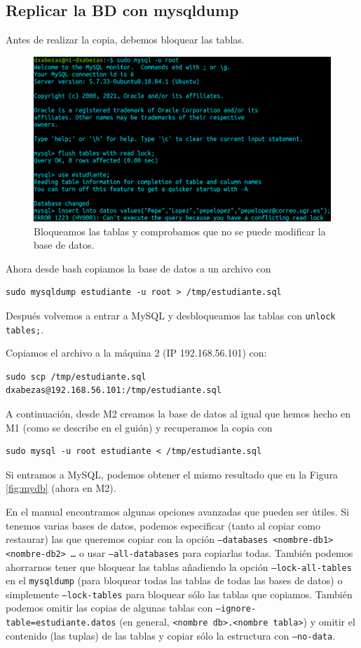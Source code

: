 \documentclass{article}
\begin{document}
\subsection{Replicar la BD con mysqldump}

Antes de realizar la copia, debemos bloquear las tablas.

\begin{figure}[H]
	\centering
	\includegraphics[width=150mm]{imgs/lock}
	\caption{Bloqueamos las tablas y comprobamos que no se puede modificar la base de datos.}
	\label{fig:lock}
\end{figure}

Ahora desde bash copiamos la base de datos a un archivo con
\begin{Verbatim}
sudo mysqldump estudiante -u root > /tmp/estudiante.sql
\end{Verbatim}
Después volvemos a entrar a MySQL y desbloqueamos las tablas con \verb|unlock tables;|. 

Copiamos el archivo a la máquina 2 (IP 192.168.56.101) con:
\begin{Verbatim}
sudo scp /tmp/estudiante.sql dxabezas@192.168.56.101:/tmp/estudiante.sql
\end{Verbatim}

A continuación, desde M2 creamos la base de datos al igual que hemos hecho en M1 (como se describe en el guión) y recuperamos
la copia con 
\begin{Verbatim}
sudo mysql -u root estudiante < /tmp/estudiante.sql
\end{Verbatim}
Si entramos a MySQL, podemos obtener el mismo resultado que en la Figura \ref{fig:mydb} (ahora en M2).

En el manual encontramos algunas opciones avanzadas que pueden ser útiles. Si tenemos varias bases de datos, podemos especificar
(tanto al copiar como restaurar)
las que queremos copiar con la opción \texttt{--databases <nombre-db1> <nombre-db2> \ldots} o usar \texttt{--all-databases} para
copiarlas todas. También podemos ahorrarnos tener que bloquear las tablas añadiendo la opción \texttt{--lock-all-tables} en el
\texttt{mysqldump} (para bloquear todas las tablas de todas las bases de datos) o simplemente \texttt{--lock-tables} para bloquear
sólo las tablas que copiamos. También podemos omitir las copias de algunas tablas con \texttt{--ignore-table=estudiante.datos} (en general, \texttt{<nombre db>.<nombre tabla>}) y omitir el contenido (las tuplas) de las tablas y copiar sólo la estructura con \texttt{--no-data}.
\end{document}
